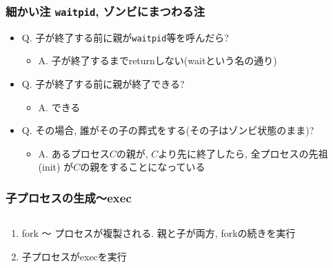\documentclass[12pt,dvipdfmx]{beamer}
\begin{document}
\begin{frame}
  \frametitle{{\small 細かい注} {\tt waitpid}, ゾンビにまつわる注}
  \begin{itemize}
  \item Q. 子が終了する前に親が{\tt waitpid}等を呼んだら?
    \begin{itemize}
    \item A. 子が終了するまでreturnしない(waitという名の通り)
    \end{itemize}
  \item Q. 子が終了する前に親が終了できる?
    \begin{itemize}
    \item A. できる
    \end{itemize}
  \item Q. その場合, 誰がその子の葬式をする(その子はゾンビ状態のまま)?
    \begin{itemize}
    \item A. あるプロセス$C$の親が, $C$より先に終了したら,
      全プロセスの先祖 (init) が$C$の親をすることになっている
    \end{itemize}
  \end{itemize}
\end{frame}

\begin{frame}
\frametitle{子プロセスの生成〜exec}
\begin{columns}
  \begin{column}{0.5\textwidth}
    \begin{enumerate}
    \item<3-> fork 〜 プロセスが複製される. 親と子が両方, forkの続きを実行
    \item<4-> 子プロセスがexecを実行
    \end{enumerate}
  \end{column}
  \begin{column}{0.5\textwidth}
\begin{center}
%
%
%
%
%
\end{center}
  \end{column}
\end{columns}
\end{frame}
\end{document}
